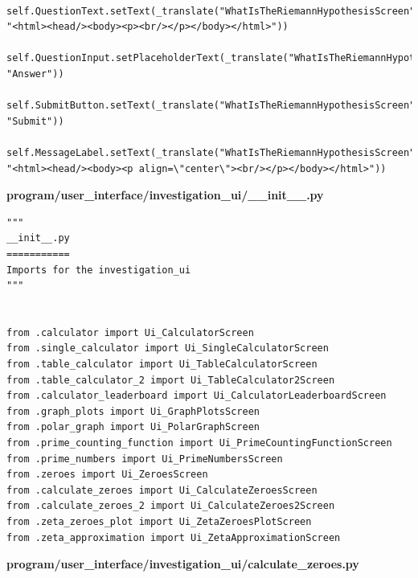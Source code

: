 \documentclass{article}
\begin{document}
\begin{lstlisting}
        self.QuestionText.setText(_translate("WhatIsTheRiemannHypothesisScreen", "<html><head/><body><p><br/></p></body></html>"))
        self.QuestionInput.setPlaceholderText(_translate("WhatIsTheRiemannHypothesisScreen", "Answer"))
        self.SubmitButton.setText(_translate("WhatIsTheRiemannHypothesisScreen", "Submit"))
        self.MessageLabel.setText(_translate("WhatIsTheRiemannHypothesisScreen", "<html><head/><body><p align=\"center\"><br/></p></body></html>"))
\end{lstlisting}


\textbf{program/user\_interface/investigation\_ui/\_\_init\_\_.py}

\begin{lstlisting}
"""
__init__.py
===========
Imports for the investigation_ui
"""


from .calculator import Ui_CalculatorScreen
from .single_calculator import Ui_SingleCalculatorScreen
from .table_calculator import Ui_TableCalculatorScreen
from .table_calculator_2 import Ui_TableCalculator2Screen
from .calculator_leaderboard import Ui_CalculatorLeaderboardScreen
from .graph_plots import Ui_GraphPlotsScreen
from .polar_graph import Ui_PolarGraphScreen
from .prime_counting_function import Ui_PrimeCountingFunctionScreen
from .prime_numbers import Ui_PrimeNumbersScreen
from .zeroes import Ui_ZeroesScreen
from .calculate_zeroes import Ui_CalculateZeroesScreen
from .calculate_zeroes_2 import Ui_CalculateZeroes2Screen
from .zeta_zeroes_plot import Ui_ZetaZeroesPlotScreen
from .zeta_approximation import Ui_ZetaApproximationScreen
\end{lstlisting}


\textbf{program/user\_interface/investigation\_ui/calculate\_zeroes.py}
\end{document}
